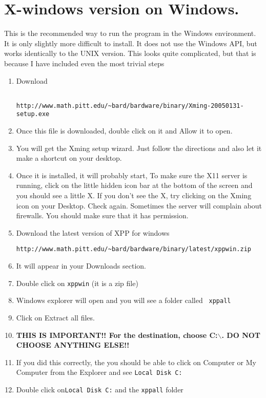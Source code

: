 \documentclass{article}
\begin{document}
\section{X-windows version on Windows.} This is the recommended way
to run the program in the Windows environment. It is only slightly
more difficult to
install. It does not use the Windows API,
but works identically to the UNIX version.
This looks quite complicated, but that is because I have included even
the most trivial steps

\begin{enumerate}
\item Download
\begin{verbatim}

http://www.math.pitt.edu/~bard/bardware/binary/Xming-20050131-setup.exe
\end{verbatim}
\item Once this file is downloaded, double click on it and Allow it to
open.
\item You will get the Xming setup wizard. Just follow the directions
and also let it make a shortcut on your desktop.
\item Once it is installed, it will probably start,  To make sure the
X11 server is running, click on the little hidden icon bar at the
bottom of the screen and you should see a little X.
If you don't see the X, try clicking on the Xming icon on your
Desktop. Check again. Sometimes the server will complain about
firewalls. You should make sure that it has permission.
\item Download the latest version of XPP for windows
\begin{verbatim}
http://www.math.pitt.edu/~bard/bardware/binary/latest/xppwin.zip
\end{verbatim}
\item It will appear in your Downloads section.
\item Double click on {\tt xppwin} (it is a zip file)
\item Windows explorer will open and you will see a folder called {\tt
xppall}
\item Click on Extract all files.
\item {\bf THIS IS IMPORTANT!! For the destination, choose
C:$\backslash$. DO NOT CHOOSE ANYTHING ELSE!!}
\item If you did this correctly, the  you should be able to click on
Computer  or My Computer from the Explorer and see {\tt Local Disk C:}
\item Double click on{\tt Local Disk C:}  and the {\tt xppall} folder

\end{enumerate}
\end{document}
